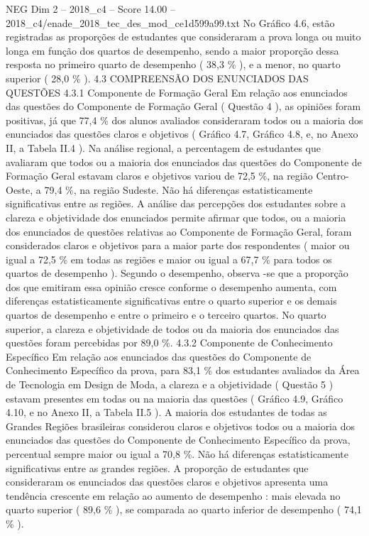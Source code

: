 \begin{textsample}{NEG Dim 2 – 2018\_c4 – Score 14.00 – 2018\_c4/enade\_2018\_tec\_des\_mod\_ce1d599a99.txt}
No Gráfico 4.6, estão registradas as proporções de estudantes que consideraram a prova longa ou muito longa em função dos quartos de desempenho, sendo a maior proporção dessa resposta no primeiro quarto de desempenho ( 38,3 \% ), e a menor, no quarto superior ( 28,0 \% ). 4.3 COMPREENSÃO DOS ENUNCIADOS DAS QUESTÕES 4.3.1 Componente de Formação Geral Em relação aos enunciados das questões do Componente de Formação Geral ( Questão 4 ), as opiniões foram positivas, já que 77,4 \% dos alunos avaliados consideraram todos ou a maioria dos enunciados das questões claros e objetivos ( Gráfico 4.7, Gráfico 4.8, e, no Anexo II, a Tabela II.4 ).
Na análise regional, a percentagem de estudantes que avaliaram que todos ou a maioria dos enunciados das questões do Componente de Formação Geral estavam claros e objetivos variou de 72,5 \%, na região Centro-Oeste, a 79,4 \%, na região Sudeste.
Não há diferenças estatisticamente significativas entre as regiões.
A análise das percepções dos estudantes sobre a clareza e objetividade dos enunciados permite afirmar que todos, ou a maioria dos enunciados de questões relativas ao Componente de Formação Geral, foram considerados claros e objetivos para a maior parte dos respondentes ( maior ou igual a 72,5 \% em todas as regiões e maior ou igual a 67,7 \% para todos os quartos de desempenho ).
Segundo o desempenho, observa -se que a proporção dos que emitiram essa opinião cresce conforme o desempenho aumenta, com diferenças estatisticamente significativas entre o quarto superior e os demais quartos de desempenho e entre o primeiro e o terceiro quartos.
No quarto superior, a clareza e objetividade de todos ou da maioria dos enunciados das questões foram percebidas por 89,0 \%. 4.3.2 Componente de Conhecimento Específico Em relação aos enunciados das questões do Componente de Conhecimento Específico da prova, para 83,1 \% dos estudantes avaliados da Área de Tecnologia em Design de Moda, a clareza e a objetividade ( Questão 5 ) estavam presentes em todas ou na maioria das questões ( Gráfico 4.9, Gráfico 4.10, e no Anexo II, a Tabela II.5 ).
A maioria dos estudantes de todas as Grandes Regiões brasileiras considerou claros e objetivos todos ou a maioria dos enunciados das questões do Componente de Conhecimento Específico da prova, percentual sempre maior ou igual a 70,8 \%.
Não há diferenças estatisticamente significativas entre as grandes regiões.
A proporção de estudantes que consideraram os enunciados das questões claros e objetivos apresenta uma tendência crescente em relação ao aumento de desempenho : mais elevada no quarto superior ( 89,6 \% ), se comparada ao quarto inferior de desempenho ( 74,1 \% ).

\end{textsample}
